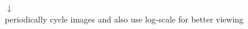 \documentclass[10pt,a4paper]{article}
\begin{document}
\begin{figure}
\begin{center}
\begin{minipage}{0.5\linewidth}
\begin{minipage}{0.5\linewidth}
    \end{minipage}\begin{minipage}{0.5\linewidth}\begin{center}
    \end{center}\end{minipage}\begin{center}
                $\downarrow$\\
        periodically cycle images and also use log-scale for better viewing
    \end{center}\begin{minipage}{0.5\linewidth}

\end{minipage}
\end{minipage}
\end{center}
\end{figure}
\end{document}
